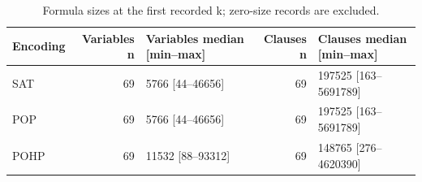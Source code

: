 \begin{table}[htbp]
\centering
\small
\caption{Formula sizes at the first recorded k; zero-size records are excluded.}
\label{tab:formula-size}
\begin{tabular}{lrlrl}
\hline
Encoding & Variables n & Variables median [min--max] & Clauses n & Clauses median [min--max] \\
\hline
SAT & 69 & 5766 [44--46656] & 69 & 197525 [163--5691789] \\
POP & 69 & 5766 [44--46656] & 69 & 197525 [163--5691789] \\
POHP & 69 & 11532 [88--93312] & 69 & 148765 [276--4620390] \\
\hline
\end{tabular}
\end{table}
